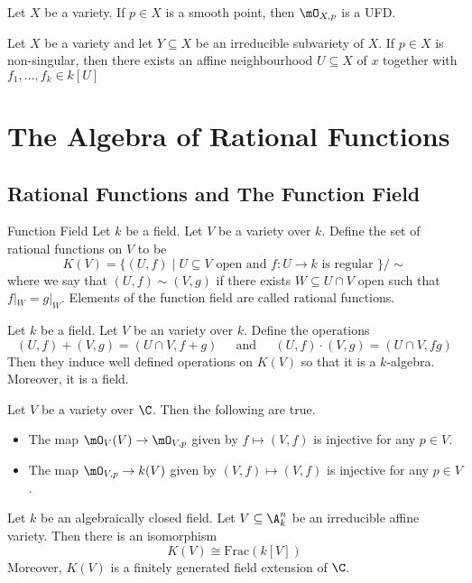 \documentclass[a4paper]{article}
\begin{document}
\begin{prp}{}{} Let $X$ be a variety. If $p\in X$ is a smooth point, then $\mO_{X,p}$ is a UFD. 
\end{prp}

\begin{prp}{}{} Let $X$ be a variety and let $Y\subseteq X$ be an irreducible subvariety of $X$. If $p\in X$ is non-singular, then there exists an affine neighbourhood $U\subseteq X$ of $x$ together with $f_1,\dots,f_k\in k[U]$
\end{prp}

\pagebreak
\section{The Algebra of Rational Functions}
\subsection{Rational Functions and The Function Field}
\begin{defn}{Function Field}{} Let $k$ be a field. Let $V$ be a variety over $k$. Define the set of rational functions on $V$ to be $$K(V)=\{(U,f)\;|\;U\subseteq V\text{ open and }f:U\to k\text{ is regular }\}/\sim$$ where we say that $(U,f)\sim(V,g)$ if there exists $W\subseteq U\cap V$ open such that $f|_W=g|_W$. Elements of the function field are called rational functions. 
\end{defn}

\begin{lmm}{}{} Let $k$ be a field. Let $V$ be an variety over $k$. Define the operations $$(U,f)+(V,g)=(U\cap V,f+g)\;\;\;\;\text{ and }\;\;\;\;(U,f)\cdot(V,g)=(U\cap V,fg)$$ Then they induce well defined operations on $K(V)$ so that it is a $k$-algebra. Moreover, it is a field. 
\end{lmm}

\begin{lmm}{}{} Let $V$ be a variety over $\C$. Then the following are true. 
\begin{itemize}
\item The map $\mO_V(V)\to\mO_{V,p}$ given by $f\mapsto(V,f)$ is injective for any $p\in V$. 
\item The map $\mO_{V,p}\to k(V)$ given by $(V,f)\mapsto(V,f)$ is injective for any $p\in V$. 
\end{itemize}
\end{lmm}

\begin{prp}{}{} Let $k$ be an algebraically closed field. Let $V\subseteq\A_k^n$ be an irreducible affine variety. Then there is an isomorphism $$K(V)\cong\text{Frac}(k[V])$$ Moreover, $K(V)$ is a finitely generated field extension of $\C$. 
\end{prp}
\end{document}
